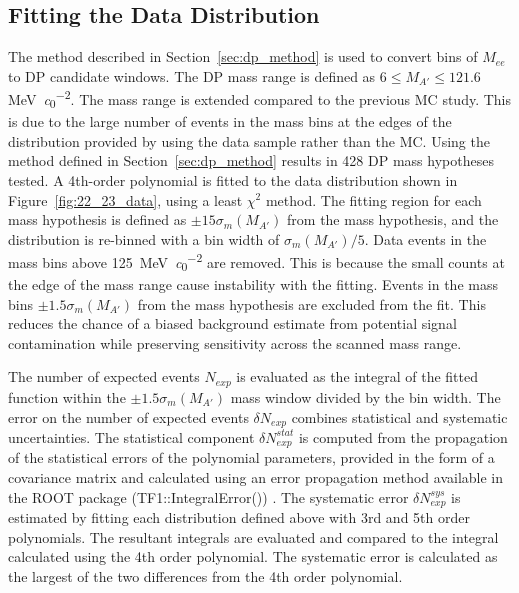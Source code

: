 \documentclass[../../main.tex]{subfiles}
\begin{document}
    \subsection{Fitting the Data Distribution}
    The method described in Section~\ref{sec:dp_method} is used to convert bins of $M_{ee}$ to \gls{DP} candidate windows.
    The \gls{DP} mass range is defined as $6 \leq M_{A'} \leq 121.6$\,\si{\mega\electronvolt\per\clight\squared}. The mass range is extended compared to the previous \gls{MC} study. This is due to the large number of events in the mass bins at the edges of the distribution provided by using the data sample rather than the MC. 
    Using the method defined in Section~\ref{sec:dp_method} results in 428 \gls{DP} mass hypotheses tested. 
    A 4th-order polynomial is fitted to the data distribution shown in Figure~\ref{fig:22_23_data}, using a least $\chi^2$ method. The fitting region for each mass hypothesis is defined as $\pm 15\sigma_m(M_{A'})$ from the mass hypothesis, and the distribution is re-binned with a bin width of $\sigma_m(M_{A'}) / 5$. 
    Data events in the mass bins above \SI{125}{\mega\electronvolt\per\clight\squared} are removed. This is because the small counts at the edge of the mass range cause instability with the fitting.
    Events in the mass bins $\pm 1.5 \sigma_m(M_{A'})$ from the mass hypothesis are excluded from the fit. This reduces the chance of a biased background estimate from potential signal contamination while preserving sensitivity across the scanned mass range.
    
    The number of expected events $N_{exp}$ is evaluated as the integral of the fitted function within the $\pm 1.5 \sigma_m(M_{A'})$ mass window divided by the bin width. The error on the number of expected events $\delta N_{exp}$ combines statistical and systematic uncertainties. The statistical component $\delta N_{exp}^{stat}$ is computed from the propagation of the 
    statistical errors of the polynomial parameters, provided in the form of a covariance matrix and calculated using an error propagation method available in the ROOT package (TF1::IntegralError()) \cite{Brun1997} . 
    The systematic error $\delta N_{exp}^{sys}$ is estimated by fitting each distribution defined above with 3rd and 5th order polynomials. The resultant integrals are evaluated and compared to the integral calculated using the 4th order polynomial. The systematic error is calculated as the largest of the two differences from the 4th order polynomial.
    
\end{document}
